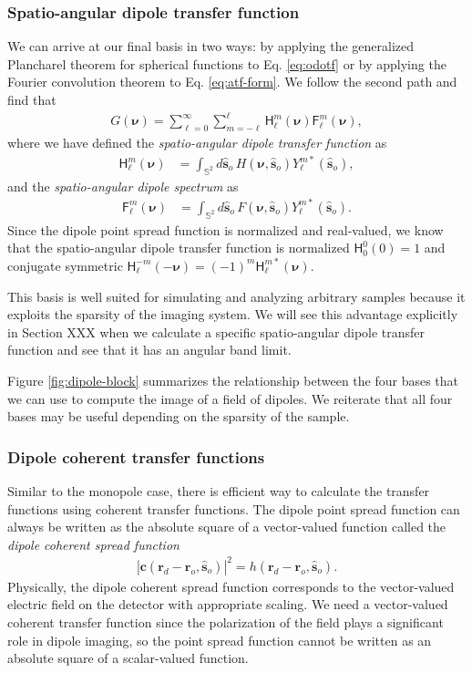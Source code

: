\documentclass[]{osa-article}
\providecommand{\mb}[1]{\mathbf{#1}}
\providecommand{\msf}[1]{\mathsf{#1}}
\providecommand{\ro}{\mathbf{\mathbf{r}}_o}
\providecommand{\so}{\mathbf{\hat{s}}_o}
\providecommand{\rd}{\mathbf{r}_d}
\providecommand{\mbb}[1]{\mathbb{#1}}
\providecommand{\bs}[1]{\boldsymbol{#1}}
\providecommand{\bv}{\bs{\nu}}
\providecommand{\lmsum}{\sum_{\ell=0}^\infty\sum_{m=-\ell}^{\ell}}
\begin{document}
\subsubsection{Spatio-angular dipole transfer function}
We can arrive at our final basis in two ways: by applying the generalized
Plancharel theorem for spherical functions to Eq. \ref{eq:odotf} or by applying
the Fourier convolution theorem to Eq. \ref{eq:atf-form}. We follow the
second path and find that
\begin{align}
G(\bv) = \lmsum \msf{H}_\ell^m(\bv)\msf{F}_\ell^m(\bv) \label{eq:saft},
\end{align}
where we have defined the \textit{spatio-angular dipole transfer function} as
  \begin{align}
  \msf{H}_\ell^m(\bv) &= \int_{\mbb{S}^2}d\so\, H(\bv, \so)Y_\ell^{m*}(\so),
  \end{align}
  and the \textit{spatio-angular dipole spectrum} as
  \begin{align}
  \msf{F}_\ell^m(\bv) &= \int_{\mbb{S}^2}d\so\, F(\bv, \so)Y_\ell^{m*}(\so).
  \end{align}
  Since the dipole point spread function is normalized and real-valued, we know
  that the spatio-angular dipole transfer function is normalized
  $\msf{H}_0^0(0) = 1$ and conjugate symmetric
  $\msf{H}_\ell^{-m}(-\bv) = (-1)^m\msf{H}_\ell^{m*}(\bv)$.
  
  This basis is well suited for simulating and analyzing arbitrary samples
  because it exploits the sparsity of the imaging system. We will see this
  advantage explicitly in Section XXX when we calculate a specific
  spatio-angular dipole transfer function and see that it has an angular band
  limit.

  Figure \ref{fig:dipole-block} summarizes the relationship between the four
  bases that we can use to compute the image of a field of dipoles. We reiterate
  that all four bases may be useful depending on the sparsity of the sample.
    
\subsubsection{Dipole coherent transfer functions}
Similar to the monopole case, there is efficient way to calculate the transfer
functions using coherent transfer functions. The dipole point spread function
can always be written as the absolute square of a vector-valued function called
the \textit{dipole coherent spread function}
\begin{align}
  |\mb{c}(\rd - \ro, \so)|^2 = h(\rd - \ro, \so). \label{eq:absquare2}
\end{align}
Physically, the dipole coherent spread function corresponds to the vector-valued
electric field on the detector with appropriate scaling. We need a vector-valued
coherent transfer function since the polarization of the field plays a
significant role in dipole imaging, so the point spread function cannot be
written as an absolute square of a scalar-valued function.
\end{document}
